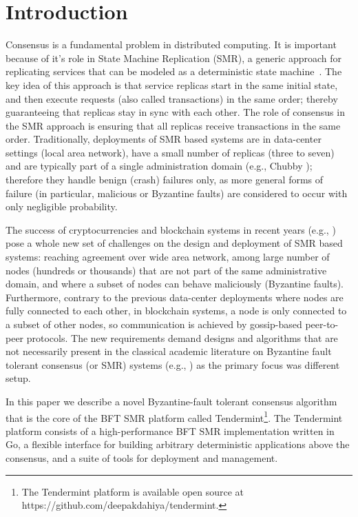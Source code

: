 \section{Introduction} \label{sec:tendermint}

Consensus is a fundamental problem in distributed computing. It
is important because of it's role in State Machine Replication (SMR), a generic
approach for replicating services that can be modeled as a deterministic state
machine~\cite{Lam78:cacm, Sch90:survey}. The key idea of this approach is that
service replicas start in the same initial state, and then execute requests
(also called transactions) in the same order; thereby guaranteeing that
replicas stay in sync with each other. The role of consensus in the SMR
approach is ensuring that all replicas receive transactions in the same order.
Traditionally, deployments of SMR based systems are in data-center settings
(local area network), have a small number of replicas (three to seven) and are
typically part of a single administration domain (e.g., Chubby
\cite{Bur:osdi06}); therefore they handle benign (crash) failures only, as more
general forms of failure (in particular, malicious or Byzantine faults) are
considered to occur with only negligible probability.  

The success of cryptocurrencies and blockchain systems in recent years (e.g.,
\cite{Nak2012:bitcoin, But2014:ethereum}) pose a whole new set of challenges on
the design and deployment of SMR based systems: reaching agreement over wide
area network, among large number of nodes (hundreds or thousands) that are not
part of the same administrative domain, and where a subset of nodes can behave
maliciously (Byzantine faults). Furthermore, contrary to the previous
data-center deployments where nodes are fully connected to each other, in
blockchain systems, a node is only connected to a subset of other nodes, so
communication is achieved by gossip-based peer-to-peer protocols. 
The new requirements demand designs and algorithms that are not necessarily
present in the classical academic literature on Byzantine fault tolerant
consensus (or SMR) systems (e.g., \cite{DLS88:jacm, CL02:tcs}) as the primary 
focus was different setup. 

In this paper we describe a novel Byzantine-fault tolerant consensus algorithm
that is the core of the BFT SMR platform called Tendermint\footnote{The
	Tendermint platform is available open source at
	https://github.com/deepakdahiya/tendermint.}. The Tendermint platform consists of
a high-performance BFT SMR implementation written in Go, a flexible interface
for
building arbitrary deterministic applications above the consensus, and a suite
of tools for deployment and management.  

